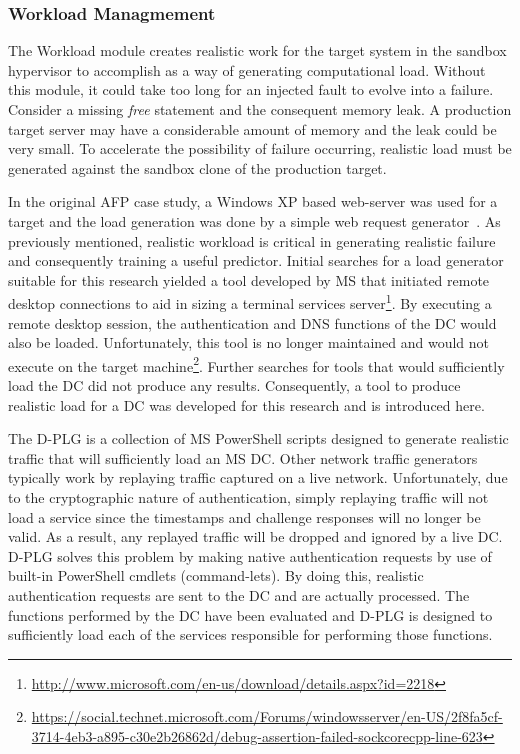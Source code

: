 \tabFaults
\tabTranslationThirtyTwo
\tabTranslationSixtyFour

\subsubsection{Workload Managmement} \label{sec:workloadMgr} 
The Workload module creates realistic work for the target system in the sandbox
hypervisor to accomplish as a way of generating computational load.  Without
this module, it could take too long for an injected fault to evolve into a
failure.  Consider a missing \emph{free} statement and the consequent memory
leak.  A production target server may have a considerable amount of memory and
the leak could be very small.  To accelerate the possibility of failure
occurring, realistic load must be generated against the sandbox clone of the
production target.

In the original \ac{AFP} case study, a Windows XP based web-server was used for
a target and the load generation was done by a simple web request
generator~\cite{irrera2015}.  As previously mentioned, realistic workload is
critical in generating realistic failure and consequently training a useful
predictor.  Initial searches for a load generator suitable for this research
yielded a tool developed by \ac{MS} that initiated remote desktop connections
to aid in sizing a terminal services
server\footnote{\url{http://www.microsoft.com/en-us/download/details.aspx?id=2218}}.
By executing a remote desktop session, the authentication and \ac{DNS}
functions of the \ac{DC} would also be loaded.  Unfortunately, this tool is no
longer maintained and would not execute on the target
machine\footnote{\url{https://social.technet.microsoft.com/Forums/windowsserver/en-US/2f8fa5cf-3714-4eb3-a895-c30e2b26862d/debug-assertion-failed-sockcorecpp-line-623}}.
Further searches for tools that would sufficiently load the \ac{DC} did not
produce any results.  Consequently, a tool to produce realistic load for a
\ac{DC} was developed for this research and is introduced here.

The \ac{D-PLG} is a collection of \ac{MS} PowerShell scripts designed to
generate realistic traffic that will sufficiently load an \ac{MS} \ac{DC}.
Other network traffic generators typically work by replaying traffic captured
on a live network.  Unfortunately, due to the cryptographic nature of
authentication, simply replaying traffic will not load a service since the
timestamps and challenge responses will no longer be valid.  As a result, any
replayed traffic will be dropped and ignored by a live \ac{DC}.  \ac{D-PLG}
solves this problem by making native authentication requests by use of built-in
PowerShell cmdlets (command-lets).  By doing this, realistic authentication
requests are sent to the \ac{DC} and are actually processed.  The functions
performed by the \ac{DC} have been evaluated and \ac{D-PLG} is designed to
sufficiently load each of the services responsible for performing those
functions.

